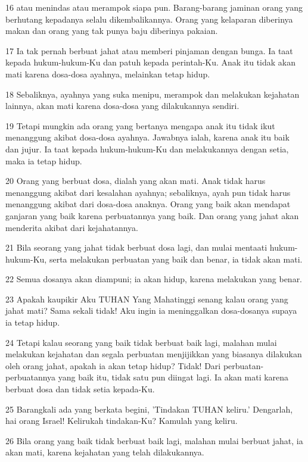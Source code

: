 \par 16 atau menindas atau merampok siapa pun. Barang-barang jaminan orang yang berhutang kepadanya selalu dikembalikannya. Orang yang kelaparan diberinya makan dan orang yang tak punya baju diberinya pakaian.
\par 17 Ia tak pernah berbuat jahat atau memberi pinjaman dengan bunga. Ia taat kepada hukum-hukum-Ku dan patuh kepada perintah-Ku. Anak itu tidak akan mati karena dosa-dosa ayahnya, melainkan tetap hidup.
\par 18 Sebaliknya, ayahnya yang suka menipu, merampok dan melakukan kejahatan lainnya, akan mati karena dosa-dosa yang dilakukannya sendiri.
\par 19 Tetapi mungkin ada orang yang bertanya mengapa anak itu tidak ikut menanggung akibat dosa-dosa ayahnya. Jawabnya ialah, karena anak itu baik dan jujur. Ia taat kepada hukum-hukum-Ku dan melakukannya dengan setia, maka ia tetap hidup.
\par 20 Orang yang berbuat dosa, dialah yang akan mati. Anak tidak harus menanggung akibat dari kesalahan ayahnya; sebaliknya, ayah pun tidak harus menanggung akibat dari dosa-dosa anaknya. Orang yang baik akan mendapat ganjaran yang baik karena perbuatannya yang baik. Dan orang yang jahat akan menderita akibat dari kejahatannya.
\par 21 Bila seorang yang jahat tidak berbuat dosa lagi, dan mulai mentaati hukum-hukum-Ku, serta melakukan perbuatan yang baik dan benar, ia tidak akan mati.
\par 22 Semua dosanya akan diampuni; ia akan hidup, karena melakukan yang benar.
\par 23 Apakah kaupikir Aku TUHAN Yang Mahatinggi senang kalau orang yang jahat mati? Sama sekali tidak! Aku ingin ia meninggalkan dosa-dosanya supaya ia tetap hidup.
\par 24 Tetapi kalau seorang yang baik tidak berbuat baik lagi, malahan mulai melakukan kejahatan dan segala perbuatan menjijikkan yang biasanya dilakukan oleh orang jahat, apakah ia akan tetap hidup? Tidak! Dari perbuatan-perbuatannya yang baik itu, tidak satu pun diingat lagi. Ia akan mati karena berbuat dosa dan tidak setia kepada-Ku.
\par 25 Barangkali ada yang berkata begini, 'Tindakan TUHAN keliru.' Dengarlah, hai orang Israel! Kelirukah tindakan-Ku? Kamulah yang keliru.
\par 26 Bila orang yang baik tidak berbuat baik lagi, malahan mulai berbuat jahat, ia akan mati, karena kejahatan yang telah dilakukannya.
